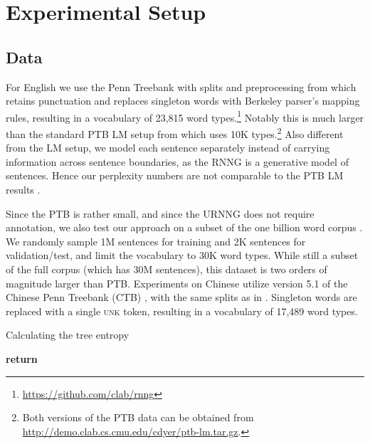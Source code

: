 \documentclass[11pt,a4paper]{article}
\begin{document}
\vspace{-2mm}
\section{Experimental Setup}
\vspace{-2mm}
\subsection{Data}\vspace{-1mm} \label{sec:data}
For English we use the Penn Treebank \cite[PTB]{marcus1993ptb} with splits and preprocessing from \citet{dyer2016rnng} which retains punctuation and replaces singleton words with Berkeley parser's mapping rules, resulting in a vocabulary of 23,815 word types.\footnote{\url{https://github.com/clab/rnng}} Notably this is much larger than the standard PTB LM setup from \citet{Mikolov2010} which uses 10K types.\footnote{Both versions of the PTB data can be obtained from  \url{http://demo.clab.cs.cmu.edu/cdyer/ptb-lm.tar.gz}.}
Also different from the LM setup, we model each sentence separately instead of carrying information across sentence boundaries, as the RNNG is a generative model of sentences. Hence our perplexity numbers are not comparable to the PTB LM results \cite{melis2018sota,merity2018reg,yang2018softmax}. 

Since the PTB is rather small, and since the URNNG does not require annotation, we also test our approach on a subset of the one billion word corpus \cite{chelba2013oneb}. We randomly sample 1M sentences for training and 2K sentences for validation/test, and limit the vocabulary to 30K word types. While still a subset of the full corpus (which has 30M sentences), this dataset is two orders of magnitude larger than PTB.
Experiments on Chinese utilize version 5.1 of the Chinese Penn Treebank (CTB) \cite{xue2005ctb}, with
the same splits as in \citet{chen2014fast}. Singleton words are replaced with a single \textsc{unk} token, resulting in a vocabulary of 17,489 word types.
\vspace{-1mm}
\begin{algorithm}[t]
    \caption{Calculating the tree entropy }
    \label{alg:entropy}
    \begin{algorithmic}[1]   
         
                    \State 
                    \EndFor
             
             
            \State  {}
            \State 
            \State 
                     \EndFor
            \State 
            \State 
            \EndFor
            \EndFor
            \State \textbf{return} 
        \EndProcedure
    \end{algorithmic}
\end{algorithm}
\vspace{-1mm}
\end{document}
